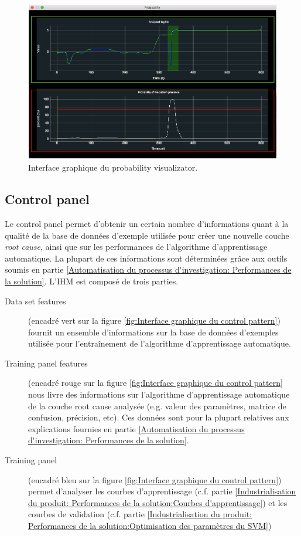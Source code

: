 \begin{figure}[h]
	\centering\includegraphics[height=7cm]{images/proba_visu.png}
	\caption[Interface graphique du probability visualizator]{Interface graphique du probability visualizator.}
	\label{fig:Interface graphique du probability visualizator}
\end{figure}

\subsection{Control panel}
\label{Industrialisation du produit: Outils graphiques: Control panel}
Le control panel permet d'obtenir un certain nombre d'informations quant à la qualité de la base de données d'exemple utilisée pour créer une nouvelle couche \emph{root cause}, ainsi que sur les performances de l'algorithme d'apprentissage automatique. La plupart de ces informations sont déterminées grâce aux outils soumis en partie \ref{Automatisation du processus d'investigation: Performances de la solution}. L'IHM est composé de trois parties.
\begin{description}
	\item [Data set features] (encadré vert sur la figure \ref{fig:Interface graphique du control pattern}) fournit un ensemble d'informations sur la base de données d'exemples utilisée pour l'entraînement de l'algorithme d'apprentissage automatique. 
	\item [Training panel features ](encadré rouge sur la figure \ref{fig:Interface graphique du control pattern} nous livre des informations sur  l'algorithme d'apprentissage automatique de la couche root cause analysée (e.g. valeur des paramètres, matrice de confusion, précision, etc). Ces données sont pour la plupart relatives aux explications fournies en partie \ref{Automatisation du processus d'investigation: Performances de la solution}.
	\item [Training panel ](encadré bleu sur la figure \ref{fig:Interface graphique du control pattern}) permet d'analyser les courbes d'apprentissage (c.f. partie \ref{Industrialisation du produit: Performances de la solution:Courbes d'apprentissage}) et les courbes de validation (c.f. partie \ref{Industrialisation du produit: Performances de la solution:Optimisation des paramètres du SVM})
\end{description}

